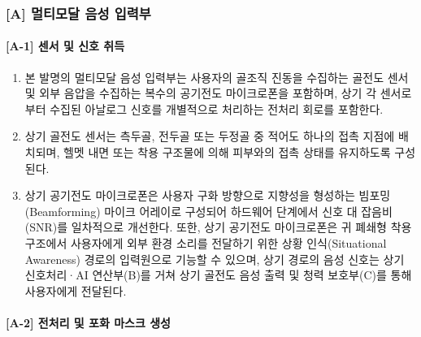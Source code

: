 \documentclass{article}
\begin{document}
\subsubsection{[A] 멀티모달 음성 입력부}

\paragraph{[A-1] 센서 및 신호 취득}

\begin{enumerate}[label = \textbf{(A.1.\arabic*)}]

    \item 본 발명의 멀티모달 음성 입력부는 사용자의 골조직 진동을 수집하는 골전도 센서 및 외부 음압을 수집하는 복수의 공기전도 마이크로폰을 포함하며, 상기 각 센서로부터 수집된 아날로그 신호를 개별적으로 처리하는 전처리 회로를 포함한다.

    \item 상기 골전도 센서는 측두골, 전두골 또는 두정골 중 적어도 하나의 접촉 지점에 배치되며, 헬멧 내면 또는 착용 구조물에 의해 피부와의 접촉 상태를 유지하도록 구성된다.

    \item 상기 공기전도 마이크로폰은 사용자 구화 방향으로 지향성을 형성하는 빔포밍(Beamforming) 마이크 어레이로 구성되어 하드웨어 단계에서 신호 대 잡음비(SNR)를 일차적으로 개선한다. 
    또한, 상기 공기전도 마이크로폰은 귀 폐쇄형 착용 구조에서 사용자에게 외부 환경 소리를 전달하기 위한 상황 인식(Situational Awareness) 경로의 입력원으로 기능할 수 있으며, 상기 경로의 음성 신호는 상기 신호처리·AI 연산부(B)를 거쳐 상기 골전도 음성 출력 및 청력 보호부(C)를 통해 사용자에게 전달된다.

\end{enumerate}


\paragraph{[A-2] 전처리 및 포화 마스크 생성}
\end{document}
